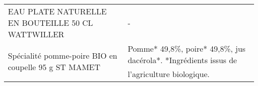 \begin{longtable}{p{5cm}p{10cm}}
                                                        EAU PLATE NATURELLE EN BOUTEILLE 50 CL WATTWILLER &                                                                                                                                                                                                                                                                                                                                                                                                                                                                                                                                                                                                                                                                                                                                                                                                                                                                                                                                                                                                                                        - \\
                                                     Spécialité pomme-poire BIO en coupelle 95 g ST MAMET &                                                                                                                                                                                                                                                                                                                                                                                                                                                                                                                                                                                                                                                                                                                                                                                                                                                                                                                                             Pomme* 49,8\%, poire* 49,8\%, jus dacérola*.  *Ingrédients issus de l'agriculture biologique. \\

\end{longtable}
